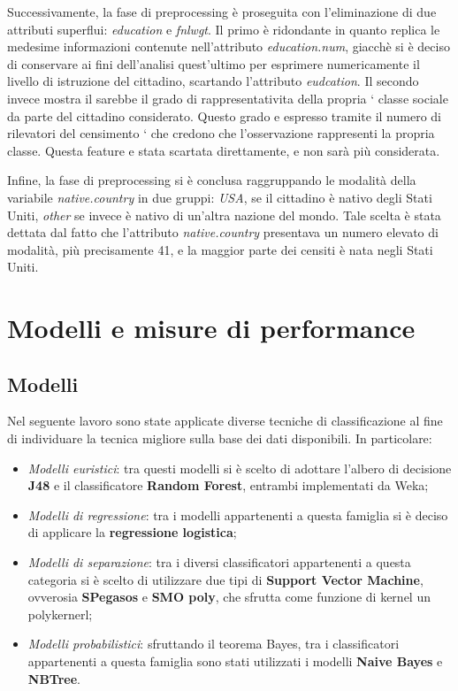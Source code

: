\documentclass[fleqn,10pt]{SelfArx}
\begin{document}
Successivamente, la fase di preprocessing è proseguita con l'eliminazione di due attributi superflui: \textit{education} e \textit{fnlwgt}. Il primo è ridondante in quanto replica le medesime informazioni contenute nell'attributo \textit{education.num}, giacchè si è deciso di conservare ai fini dell'analisi quest'ultimo per esprimere numericamente il livello di istruzione del cittadino, scartando l'attributo \textit{eudcation}. Il secondo invece mostra il sarebbe il grado di rappresentativita della propria `
classe sociale da parte del cittadino considerato. Questo grado
e espresso tramite il numero di rilevatori del censimento `
che credono che l’osservazione rappresenti la propria classe. Questa feature e stata scartata direttamente, e non sarà più considerata.

Infine, la fase di preprocessing si è conclusa raggruppando le modalità della variabile \textit{native.country} in due gruppi: \textit{USA}, se il cittadino è nativo degli Stati Uniti, \textit{other} se invece è nativo di un'altra nazione del mondo. Tale scelta è stata dettata dal fatto che l'attributo \textit{native.country} presentava un numero elevato di modalità, più precisamente 41, e la maggior parte dei censiti è nata negli Stati Uniti.
\section{Modelli e misure di performance}
\subsection{Modelli}
Nel seguente lavoro sono state applicate diverse tecniche di classificazione al fine di individuare la tecnica migliore sulla base dei dati disponibili. In particolare:
\begin{itemize}
    \item \textit{Modelli euristici}: tra questi modelli si è scelto di adottare l'albero di decisione \textbf{J48} e il classificatore \textbf{Random Forest}, entrambi implementati da Weka;
    \item \textit{Modelli di regressione}: tra i modelli appartenenti a questa famiglia si è deciso di applicare la \textbf{regressione logistica};
    \item \textit{Modelli di separazione}: tra i diversi classificatori appartenenti a questa categoria si è scelto di utilizzare due tipi di \textbf{Support Vector Machine}, ovverosia \textbf{SPegasos} e \textbf{SMO poly}, che sfrutta come funzione di kernel un polykernerl;
    \item \textit{Modelli probabilistici}: sfruttando il teorema Bayes, tra i classificatori appartenenti a questa famiglia sono stati utilizzati i modelli \textbf{Naive Bayes} e \textbf{NBTree}.
\end{itemize}
\end{document}
